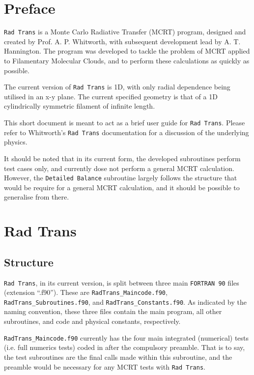 
\section{Preface}

\verb|Rad Trans| is a Monte Carlo Radiative Transfer (MCRT) program, designed and created by Prof. A. P. Whitworth, with subsequent development lead by A. T. Hannington. The program was developed to tackle the problem of MCRT applied to Filamentary Molecular Clouds, and to perform these calculations as quickly as possible.

The current version of \verb|Rad Trans| is 1D, with only radial dependence being utilised in an x-y plane. The current specified geometry is that of a 1D cylindrically symmetric filament of infinite length.

This short document is meant to act as a brief user guide for \verb|Rad Trans|. Please refer to Whitworth's \verb|Rad Trans| documentation for a discussion of the underlying physics.

It should be noted that in its current form, the developed subroutines perform test cases only, and currently dose not perform a general MCRT calculation. However, the \verb|Detailed Balance| subroutine largely follows the structure that would be require for a general MCRT calculation, and it should be possible to generalise from there. 

\section{Rad Trans}

\subsection{Structure}

\verb|Rad Trans|, in its current version, is split between three main \verb|FORTRAN 90| files (extension ``.f90''). These are \verb|RadTrans_Maincode.f90|, \verb|RadTrans_Subroutines.f90|, and \verb|RadTrans_Constants.f90|. As indicated by the naming convention, these three files contain the main program, all other subroutines, and code and physical constants, respectively.

\verb|RadTrans_Maincode.f90| currently has the four main integrated (numerical) tests (i.e. full numerics tests) coded in after the compulsory preamble. That is to say, the test subroutines are the final calls made within this subroutine, and the preamble would be necessary for any MCRT tests with \verb|Rad Trans|.

